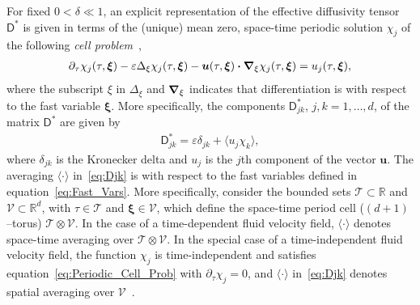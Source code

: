 \documentclass[leqno,onefignum,onetabnum]{siamltex1213}
\newcommand{\Tc}{\mathcal{T}}
\newcommand{\Vc}{\mathcal{V}}
\newcommand{\Dm}{\mathsf{D}}
\newcommand\bnabla{\mbox{\boldmath${\nabla}$}}
\providecommand\bcdot{\boldsymbol{\cdot}}
\newcommand{\vecu}{\boldsymbol{u}}
\newcommand{\vecxi}{\boldsymbol{\xi}}
\begin{document}
For fixed $0<\delta\ll1$, an explicit representation of the effective
diffusivity tensor $\Dm^*$ is given in terms of the (unique) mean
zero, space-time periodic solution $\chi_j$ of the following \emph{cell
  problem}~\cite{Majda:Kramer:1999:book},        
%
\begin{align}\label{eq:Periodic_Cell_Prob}
  \partial_\tau\chi_j(\tau,\vecxi)
  -\varepsilon\Delta_\xi\chi_j(\tau,\vecxi)
  -\vecu(\tau,\vecxi) \bcdot\bnabla_\xi \chi_j(\tau,\vecxi)
  =u_j(\tau,\vecxi),
\end{align}
%
where the subscript $\xi$ in $\Delta_\xi$ and $\bnabla_\xi$ indicates that
differentiation is with respect to the fast variable
$\vecxi$. More specifically, the components $\Dm^*_{jk}$, $j,k=1,\ldots,d$,
of the matrix $\Dm^*$ are given
by~\cite{McLaughlin:SIAM_JAM:780,Fannjiang:SIAM_JAM:333,Majda:Kramer:1999:book}          
%
\begin{align}\label{eq:Djk}
  \Dm^*_{jk}=\varepsilon\delta_{jk}+\langle u_j\chi_k\rangle,
\end{align}
%
where $\delta_{jk}$ is the Kronecker delta and $u_j$ is the $j$th component
of the vector $\vecu$. The averaging $\langle\cdot\rangle$ in~\eqref{eq:Djk} is with
respect to the fast variables defined in
equation~\eqref{eq:Fast_Vars}. More specifically, consider the bounded
sets  $\Tc\subset\mathbb{R}$ and $\Vc\subset\mathbb{R}^d$, with $\tau\in\Tc$ and
$\vecxi\in\Vc$, which define the space-time period cell ($(d+1)$--torus)
$\Tc\otimes\Vc$. In the case of a time-dependent fluid velocity field, $\langle\cdot\rangle$
denotes space-time averaging over $\Tc\otimes\Vc$. In the special case of a
time-independent fluid velocity field, the function $\chi_j$ is
time-independent and satisfies equation~\eqref{eq:Periodic_Cell_Prob}
with $\partial_\tau\chi_j=0$, and $\langle\cdot\rangle$ in~\eqref{eq:Djk} denotes spatial averaging over
$\Vc$~\cite{Fannjiang:SIAM_JAM:333,Majda:Kramer:1999:book}.    
\end{document}
